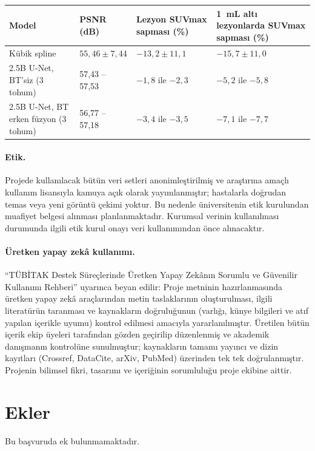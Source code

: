 \documentclass[11pt,a4paper]{article}
\begin{document}
{\small
\begin{tabularx}{\textwidth}{@{}YL{2.6cm}L{3.2cm}L{3.6cm}@{}}
\toprule
Model & PSNR (dB) & Lezyon SUVmax sapması (\%) & 1~mL altı lezyonlarda SUVmax sapması (\%) \\
\midrule
Kübik spline & $55{,}46 \pm 7{,}44$ & $-13{,}2 \pm 11{,}1$ & $-15{,}7 \pm 11{,}0$ \\
2.5B U-Net, BT'siz (3 tohum) & 57,43 -- 57,53 & $-1{,}8$ ile $-2{,}3$ & $-5{,}2$ ile $-5{,}8$ \\
2.5B U-Net, BT erken füzyon (3 tohum) & 56,77 -- 57,18 & $-3{,}4$ ile $-3{,}5$ & $-7{,}1$ ile $-7{,}7$ \\
\bottomrule
\end{tabularx}
}

\paragraph{Etik.} Projede kullanılacak bütün veri setleri anonimleştirilmiş ve araştırma amaçlı
kullanım lisansıyla kamuya açık olarak yayımlanmıştır; hastalarla doğrudan temas veya yeni
görüntü çekimi yoktur. Bu nedenle üniversitenin etik kurulundan muafiyet belgesi alınması
planlanmaktadır. Kurumsal verinin kullanılması durumunda ilgili etik kurul onayı veri
kullanımından önce alınacaktır.

\paragraph{Üretken yapay zekâ kullanımı.} ``TÜBİTAK Destek Süreçlerinde Üretken Yapay Zekânın
Sorumlu ve Güvenilir Kullanımı Rehberi'' uyarınca beyan edilir: Proje metninin hazırlanmasında
üretken yapay zekâ araçlarından metin taslaklarının oluşturulması, ilgili literatürün taranması
ve kaynakların doğruluğunun (varlığı, künye bilgileri ve atıf yapılan içerikle uyumu) kontrol
edilmesi amacıyla yararlanılmıştır. Üretilen bütün içerik ekip üyeleri tarafından gözden
geçirilip düzenlenmiş ve akademik danışmanın kontrolüne sunulmuştur; kaynakların tamamı yayıncı
ve dizin kayıtları (Crossref, DataCite, arXiv, PubMed) üzerinden tek tek doğrulanmıştır.
Projenin bilimsel fikri, tasarımı ve içeriğinin sorumluluğu proje ekibine aittir.

\section{Ekler}

Bu başvuruda ek bulunmamaktadır.
\end{document}
